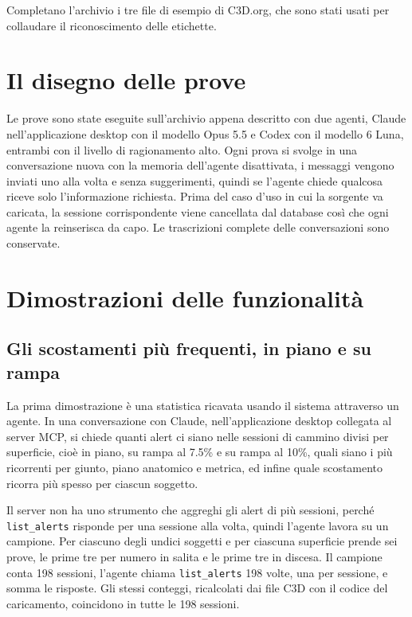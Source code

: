 Completano l'archivio i tre file di esempio di C3D.org\cite{c3dorg}, che sono
stati usati per collaudare il riconoscimento delle etichette.

\section{Il disegno delle prove}
\label{sec:ch4:disegno}

Le prove sono state eseguite sull'archivio appena descritto con
due agenti, Claude nell'applicazione desktop con il modello Opus 5.5 e Codex con
il modello 6 Luna, entrambi con il livello di ragionamento alto. Ogni prova si
svolge in una conversazione nuova con la memoria dell'agente disattivata, i
messaggi vengono inviati uno alla volta e senza suggerimenti, quindi se l'agente
chiede qualcosa riceve solo l'informazione richiesta. Prima del caso d'uso in cui la sorgente 
va caricata, la sessione corrispondente viene cancellata dal database così che ogni agente la
reinserisca da capo. Le trascrizioni complete delle conversazioni sono conservate.

\section{Dimostrazioni delle funzionalità}
\label{sec:ch4:dimostrazioni}

\subsection{Gli scostamenti più frequenti, in piano e su rampa}
\label{subsec:ch4:demo-statistica}

La prima dimostrazione è una statistica ricavata usando il sistema attraverso un
agente. In una conversazione con Claude, nell'applicazione desktop collegata al
server MCP, si chiede quanti alert ci siano nelle sessioni di cammino divisi per
superficie, cioè in piano, su rampa al 7.5\% e su rampa al 10\%, quali siano i
più ricorrenti per giunto, piano anatomico e metrica, ed infine quale scostamento
ricorra più spesso per ciascun soggetto.

Il server non ha uno strumento che aggreghi gli alert di più sessioni, perché
\texttt{list\_alerts} risponde per una sessione alla volta, quindi l'agente
lavora su un campione. Per ciascuno degli undici soggetti e per ciascuna
superficie prende sei prove, le prime tre per numero in salita e le prime tre in
discesa. Il campione conta 198 sessioni, l'agente chiama
\texttt{list\_alerts} 198 volte, una per sessione, e somma le risposte. Gli stessi
conteggi, ricalcolati dai file C3D con il codice del caricamento, coincidono in
tutte le 198 sessioni.


